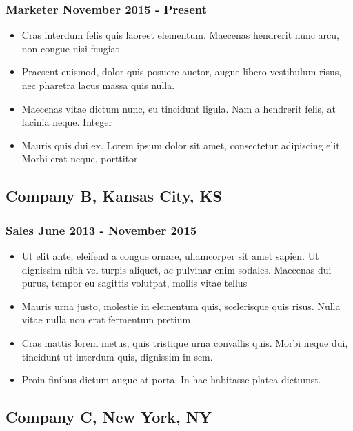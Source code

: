 \documentclass[a4paper]{article}
\begin{document}
\subsubsection{Marketer \hfill November 2015 - Present}
  \begin{itemize}
    \item Cras interdum felis quis laoreet elementum. Maecenas hendrerit nunc arcu, non congue nisi feugiat
    \item Praesent euismod, dolor quis posuere auctor, augue libero vestibulum risus, nec pharetra lacus massa quis nulla.
    \item Maecenas vitae dictum nunc, eu tincidunt ligula. Nam a hendrerit felis, at lacinia neque. Integer 
    \item Mauris quis dui ex. Lorem ipsum dolor sit amet, consectetur adipiscing elit. Morbi erat neque, porttitor
  \end{itemize}

\subsection{Company B, \textnormal{Kansas City, KS}}
\subsubsection{Sales \hfill June 2013 - November 2015}
  \begin{itemize}
    \item Ut elit ante, eleifend a congue ornare, ullamcorper sit amet sapien. Ut dignissim nibh vel turpis aliquet, ac pulvinar enim sodales. Maecenas dui purus, tempor eu sagittis volutpat, mollis vitae tellus
    \item Mauris urna justo, molestie in elementum quis, scelerisque quis risus. Nulla vitae nulla non erat fermentum pretium
    \item Cras mattis lorem metus, quis tristique urna convallis quis. Morbi neque dui, tincidunt ut interdum quis, dignissim in sem.
    \item Proin finibus dictum augue at porta. In hac habitasse platea dictumst.
  \end{itemize}

\subsection{Company C, \textnormal{New York, NY}}
\end{document}
